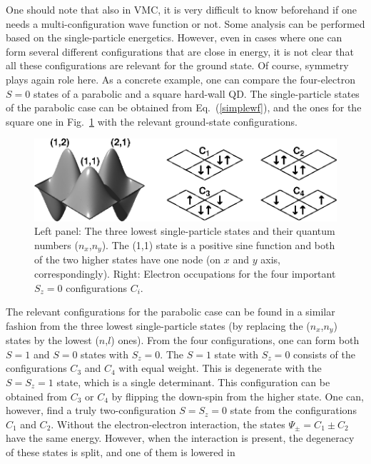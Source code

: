 \documentclass{article}
\begin{document}
One should note that also in VMC, it is very difficult to know
beforehand if one needs a multi-configuration wave function or
not. Some analysis can be performed based on the single-particle
energetics. However, even in cases where one can form several
different configurations that are close in energy, it is not clear
that all these configurations are relevant for the ground state. Of
course, symmetry plays again role here. As a concrete example, one can
compare the four-electron $S=0$ states of a parabolic and a square
hard-wall QD. The single-particle states of the parabolic case can be
obtained from Eq.~(\ref{simplewf}), and the ones for the square one in
Fig.~\ref{foofoo} with the relevant ground-state configurations.
%
\begin{figure}[hbt] 
\begin{center}
 \includegraphics[width=0.99\columnwidth]{R4u}
\caption{Left panel: The three lowest single-particle states and their
quantum numbers ($n_x$,$n_y$). The (1,1) state is a positive sine
function and both of the two higher states have one node (on $x$ and
$y$ axis, correspondingly). Right: Electron occupations for the four
important $S_z=0$ configurations $C_i$.}
\label{foofoo}
\end{center}
\end{figure}
%
The relevant configurations for the parabolic case can be found in a
similar fashion from the three lowest single-particle states (by
replacing the ($n_x$,$n_y$) states by the lowest ($n$,$l$) ones). From
the four configurations, one can form both $S=1$ and $S=0$ states with
$S_z=0$. The $S=1$ state with $S_z=0$ consists of the configurations
$C_3$ and $C_4$ with equal weight.  This is degenerate with the
$S=S_z=1$ state, which is a single determinant. This configuration can
be obtained from $C_3$ or $C_4$ by flipping the down-spin from the
higher state. One can, however, find a truly two-configuration
$S=S_z=0$ state from the configurations $C_1$ and $C_2$. Without the
electron-electron interaction, the states $\Psi_{\pm}=C_1 \pm C_2$
have the same energy. However, when the interaction is present, the
degeneracy of these states is split, and one of them is lowered in
\end{document}
